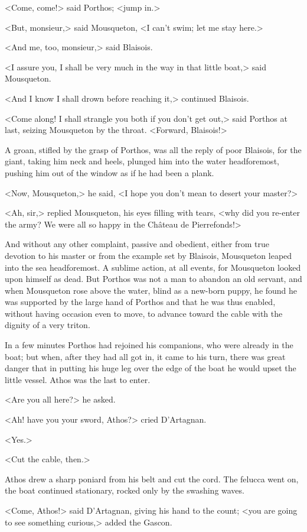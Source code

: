 <Come, come!> said Porthos; <jump in.>

<But, monsieur,> said Mousqueton, <I can't swim; let me stay here.>

<And me, too, monsieur,> said Blaisois.

<I assure you, I shall be very much in the way in that little boat,> said Mousqueton.

<And I know I shall drown before reaching it,> continued Blaisois.

<Come along! I shall strangle you both if you don't get out,> said Porthos at last, seizing Mousqueton by the throat. <Forward, Blaisois!>

A groan, stifled by the grasp of Porthos, was all the reply of poor Blaisois, for the giant, taking him neck and heels, plunged him into the water headforemost, pushing him out of the window as if he had been a plank.

<Now, Mousqueton,> he said, <I hope you don't mean to desert your master?>

<Ah, sir,> replied Mousqueton, his eyes filling with tears, <why did you re-enter the army? We were all so happy in the Château de Pierrefonds!>

And without any other complaint, passive and obedient, either from true devotion to his master or from the example set by Blaisois, Mousqueton leaped into the sea headforemost. A sublime action, at all events, for Mousqueton looked upon himself as dead. But Porthos was not a man to abandon an old servant, and when Mousqueton rose above the water, blind as a new-born puppy, he found he was supported by the large hand of Porthos and that he was thus enabled, without having occasion even to move, to advance toward the cable with the dignity of a very triton.

In a few minutes Porthos had rejoined his companions, who were already in the boat; but when, after they had all got in, it came to his turn, there was great danger that in putting his huge leg over the edge of the boat he would upset the little vessel. Athos was the last to enter.

<Are you all here?> he asked.

<Ah! have you your sword, Athos?> cried D'Artagnan.

<Yes.>

<Cut the cable, then.>

Athos drew a sharp poniard from his belt and cut the cord. The felucca went on, the boat continued stationary, rocked only by the swashing waves.

<Come, Athos!> said D'Artagnan, giving his hand to the count; <you are going to see something curious,> added the Gascon. 